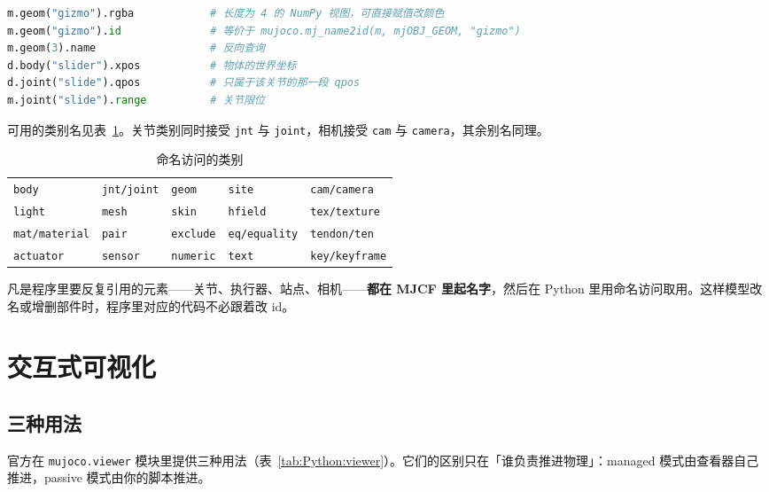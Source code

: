 \begin{lstlisting}[style=code, language=Python]
m.geom("gizmo").rgba            # 长度为 4 的 NumPy 视图，可直接赋值改颜色
m.geom("gizmo").id              # 等价于 mujoco.mj_name2id(m, mjOBJ_GEOM, "gizmo")
m.geom(3).name                  # 反向查询
d.body("slider").xpos           # 物体的世界坐标
d.joint("slide").qpos           # 只属于该关节的那一段 qpos
m.joint("slide").range          # 关节限位
\end{lstlisting}

可用的类别名见表~\ref{tab:Python:命名类别}。关节类别同时接受 \texttt{jnt} 与 \texttt{joint}，相机接受 \texttt{cam} 与 \texttt{camera}，其余别名同理。

\begin{table}[H]
	\centering
	\caption{命名访问的类别}
	\label{tab:Python:命名类别}
	\footnotesize
	\begin{tabular}{lllll}
		\hline
		\texttt{body} & \texttt{jnt/joint} & \texttt{geom} & \texttt{site} & \texttt{cam/camera} \\
		\texttt{light} & \texttt{mesh} & \texttt{skin} & \texttt{hfield} & \texttt{tex/texture} \\
		\texttt{mat/material} & \texttt{pair} & \texttt{exclude} & \texttt{eq/equality} & \texttt{tendon/ten} \\
		\texttt{actuator} & \texttt{sensor} & \texttt{numeric} & \texttt{text} & \texttt{key/keyframe} \\
		\hline
	\end{tabular}
\end{table}

\begin{tipbox}[工程习惯]
	凡是程序里要反复引用的元素——关节、执行器、站点、相机——\textbf{都在 MJCF 里起名字}，然后在 Python 里用命名访问取用。这样模型改名或增删部件时，程序里对应的代码不必跟着改 id。
\end{tipbox}

\section{交互式可视化}

\subsection{三种用法}

官方在 \texttt{mujoco.viewer} 模块里提供三种用法（表~\ref{tab:Python:viewer}）。它们的区别只在「谁负责推进物理」：managed 模式由查看器自己推进，passive 模式由你的脚本推进。

